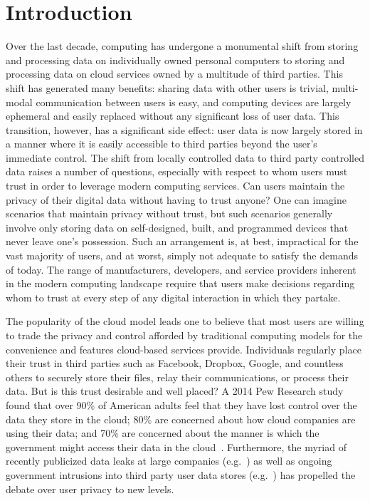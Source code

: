 \section{Introduction}
\label{sec:intro}

Over the last decade, computing has undergone a monumental shift from
storing and processing data on individually owned personal computers
to storing and processing data on cloud services owned by a multitude
of third parties. This shift has generated many benefits: sharing data
with other users is trivial, multi-modal communication between users
is easy, and computing devices are largely ephemeral and easily
replaced without any significant loss of user data. This transition,
however, has a significant side effect: user data is now largely
stored in a manner where it is easily accessible to third parties
beyond the user's immediate control. The shift from locally controlled
data to third party controlled data raises a number of questions,
especially with respect to whom users must trust in order to leverage
modern computing services. Can users maintain the privacy of their
digital data without having to trust anyone?  One can imagine
scenarios that maintain privacy without trust, but such scenarios
generally involve only storing data on self-designed, built, and
programmed devices that never leave one's possession. Such an
arrangement is, at best, impractical for the vast majority of users,
and at worst, simply not adequate to satisfy the demands of today. The
range of manufacturers, developers, and service providers inherent in
the modern computing landscape require that users make decisions
regarding whom to trust at every step of any digital interaction in
which they partake.

The popularity of the cloud model leads one to believe that most users
are willing to trade the privacy and control afforded by traditional
computing models for the convenience and features cloud-based services
provide. Individuals regularly place their trust in third parties such
as Facebook, Dropbox, Google, and countless others to securely store
their files, relay their communications, or process their data. But is
this trust desirable and well placed? A 2014 Pew Research study found
that over 90\% of American adults feel that they have lost control
over the data they store in the cloud; 80\% are concerned about how
cloud companies are using their data; and 70\% are concerned about the
manner is which the government might access their data in the
cloud~\cite{pew-privsec14}. Furthermore, the myriad of recently
publicized data leaks at large companies
(e.g.~\cite{apple-icloudleak}) as well as ongoing government
intrusions into third party user data stores
(e.g.~\cite{greenwald-prism}) has propelled the debate over user
privacy to new levels.

